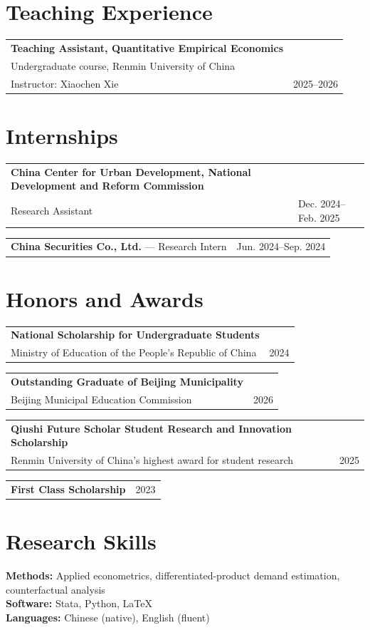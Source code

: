 \documentclass[10pt,letterpaper]{article}
\makeatletter
\newcommand{\daterow}[2]{%
  \begin{tabularx}{\textwidth}{@{}X>{\raggedleft\arraybackslash}p{1.25in}@{}}
    #1 & \textcolor{muted}{#2}
  \end{tabularx}}
\makeatother
\begin{document}
\section{Teaching Experience}
\daterow{\textbf{Teaching Assistant, Quantitative Empirical Economics}\\Undergraduate course, Renmin University of China\\Instructor: Xiaochen Xie}{2025--2026}

\section{Internships}
\daterow{\textbf{China Center for Urban Development, National Development and Reform Commission}\\Research Assistant}{Dec. 2024--Feb. 2025}
\daterow{\textbf{China Securities Co., Ltd.} --- Research Intern}{Jun. 2024--Sep. 2024}

\section{Honors and Awards}
\daterow{\textbf{National Scholarship for Undergraduate Students}\\Ministry of Education of the People's Republic of China}{2024}
\daterow{\textbf{Outstanding Graduate of Beijing Municipality}\\Beijing Municipal Education Commission}{2026}
\daterow{\textbf{Qiushi Future Scholar Student Research and Innovation Scholarship}\\Renmin University of China's highest award for student research}{2025}
\daterow{\textbf{First Class Scholarship}}{2023}

\section{Research Skills}
\textbf{Methods:} Applied econometrics, differentiated-product demand estimation, counterfactual analysis\\
\textbf{Software:} Stata, Python, \LaTeX\\
\textbf{Languages:} Chinese (native), English (fluent)
\end{document}
